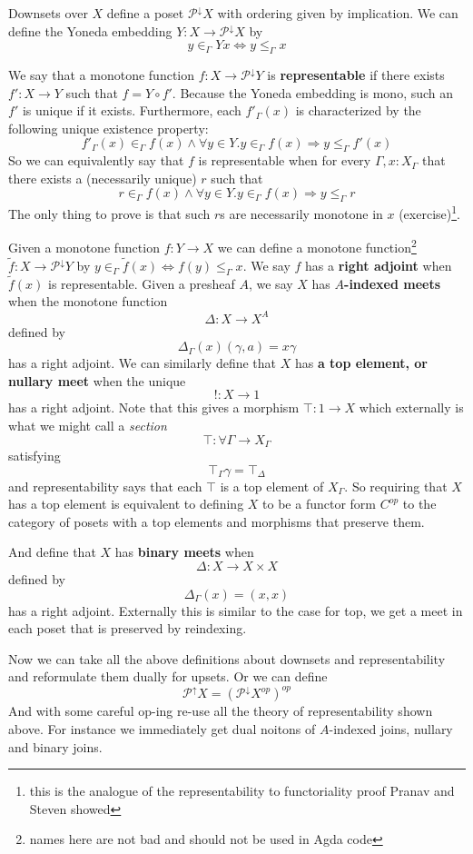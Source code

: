 \documentclass{article}
\newcommand{\downsets}{\mathcal P^{\downarrow}}
\newcommand{\upsets}{\mathcal P^{\uparrow}}
\begin{document}
Downsets over $X$ define a poset $\downsets X$ with ordering given by
implication. We can define the Yoneda embedding $Y : X \to \downsets X$ by
\[ y \in_\Gamma Y x \iff y \leq_\Gamma x \]

We say that a monotone function $f : X \to \downsets Y$ is
\textbf{representable} if there exists $f' : X \to Y$ such that $f = Y
\circ f'$. Because the Yoneda embedding is mono, such an $f'$ is
unique if it exists. Furthermore, each $f'_\Gamma(x)$ is characterized
by the following unique existence property:
\[ f'_\Gamma(x) \in_\Gamma f(x) \wedge \forall y \in Y. y \in_\Gamma f(x) \Rightarrow y \leq_\Gamma f'(x)\]
So we can equivalently say that $f$ is representable when for every $\Gamma, x : X_\Gamma$ that there exists a (necessarily unique) $r$ such that
\[ r \in_\Gamma f(x) \wedge \forall y \in Y. y \in_\Gamma f(x) \Rightarrow y \leq_\Gamma r \]
The only thing to prove is that such $r$s are necessarily monotone in $x$ (exercise)\footnote{this is the analogue of the representability to functoriality proof Pranav and Steven showed}.

Given a monotone function $f : Y \to X$ we can define a monotone
function\footnote{names here are not bad and should not be used in
Agda code} $\widetilde f : X \to \downsets Y$ by $y \in_\Gamma
\widetilde f(x) \iff f(y) \leq_\Gamma x$. We say $f$ has a
\textbf{right adjoint} when $\widetilde f(x)$ is representable.
Given a presheaf $A$, we say $X$ has \textbf{$A$-indexed meets} when the monotone function
\[ \Delta : X \to X^A \]
defined by
\[ \Delta_\Gamma(x)(\gamma,a) = x\gamma \]
has a right adjoint.
We can similarly define that $X$ has \textbf{a top element, or nullary meet} when the unique
\[ ! : X \to 1 \]
has a right adjoint. Note that this gives a morphism $\top : 1 \to X$ which externally is what we might call a \emph{section}
\[ \top : \forall \Gamma \to X_\Gamma \]
satisfying
\[ \top_\Gamma\gamma = \top_\Delta \]
and representability says that each $\top$ is a top element of
$X_\Gamma$. So requiring that $X$ has a top element is equivalent to
defining $X$ to be a functor form $C^{op}$ to the category of posets
with a top elements and morphisms that preserve them.

And define that $X$ has \textbf{binary meets} when
\[ \Delta : X \to X \times X \]
defined by
\[ \Delta_\Gamma(x) = (x,x) \]
has a right adjoint. Externally this is similar to the case for top,
we get a meet in each poset that is preserved by reindexing.

Now we can take all the above definitions about downsets and
representability and reformulate them dually for upsets. Or we can define
\[ \upsets X = (\downsets X^{op})^{op} \]
And with some careful op-ing re-use all the theory of representability
shown above. For instance we immediately get dual noitons of
$A$-indexed joins, nullary and binary joins.
\end{document}
